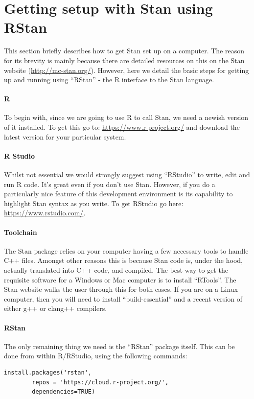 \documentclass[11pt,fullpage]{book}
\begin{document}
\section{Getting setup with Stan using RStan}\label{sec:StanJags_installation}
This section briefly describes how to get Stan set up on a computer. The reason for its brevity is mainly because there are detailed resources on this on the Stan website (\url{http://mc-stan.org/}). However, here we detail the basic steps for getting up and running using ``RStan'' - the R interface to the Stan language. 

\paragraph{R}
To begin with, since we are going to use R to call Stan, we need a newish version of it installed. To get this go to: \url{https://www.r-project.org/} and download the latest version for your particular system. 

\paragraph{R Studio}
Whilst not essential we would strongly suggest using ``RStudio'' to write, edit and run R code. It's great even if you don't use Stan. However, if you do a particularly nice feature of this development environment is its capability to highlight Stan syntax as you write. To get RStudio go here: \url{https://www.rstudio.com/}.

\paragraph{Toolchain}
The Stan package relies on your computer having a few necessary tools to handle C++ files. Amongst other reasons this is because Stan code is, under the hood, actually translated into C++ code, and compiled. The best way to get the requisite software for a Windows or Mac computer is to install ``RTools''. The Stan website walks the user through this for both cases. If you are on a Linux computer, then you will need to install ``build-essential'' and a recent version of either g++ or clang++ compilers.

\paragraph{RStan}
The only remaining thing we need is the ``RStan'' package itself. This can be done from within R/RStudio, using the following commands:
\begin{verbatim}
install.packages('rstan', 
		repos = 'https://cloud.r-project.org/',
		dependencies=TRUE)
\end{verbatim}
\end{document}

